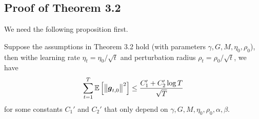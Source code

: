 \subsection{Proof of Theorem 3.2}
We need the following proposition first.

\begin{proposition} \label{prop:convergence-g}
    Suppose the assumptions in Theorem 3.2 hold (with parameters $\gamma, G, M, \eta_0, \rho_0$), then withe learning rate $\eta_t = \eta_0 / \sqrt{t}$ and perturbation radius $\rho_t = \rho_0 / \sqrt{t}$, we have
    \begin{equation}
        \sum_{t=1}^T \mathbb{E}\left[\left\|\boldsymbol{g}_{t,0}\right\|^2\right] \le \frac{C_1' + C_2' \log T}{\sqrt{T}}
    \end{equation}
    for some constants $C_1'$ and $C_2'$ that only depend on $\gamma, G, M, \eta_0, \rho_0, \alpha, \beta$.
\end{proposition}

